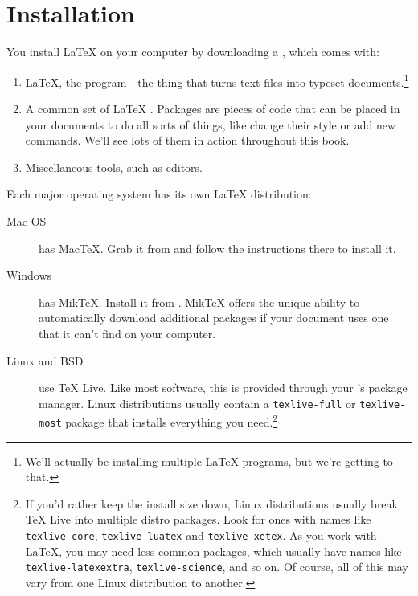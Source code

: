 \chapter{Installation}
\label{installation}

You install \LaTeX{} on your computer by downloading a ,
which comes with:
\begin{enumerate}
\item \LaTeX, the program---the thing that turns text files into typeset
    documents.\footnote{We'll actually be installing multiple \LaTeX{} programs,
    but we're getting to that.}
\item A common set of \LaTeX{} .
    Packages are pieces of code that can be placed in your documents to
    do all sorts of things, like change their style or add new commands.
    We'll see lots of them in action throughout this book.
\item Miscellaneous tools, such as editors.
\end{enumerate}
Each major operating system has its own \LaTeX{} distribution:
\begin{description}
\item[Mac OS] has Mac\TeX. Grab it from 
    and follow the instructions there to install it.

\item[Windows] has Mik\TeX.
    Install it from .
    Mik\TeX{} offers the unique ability to automatically download
    additional packages if your document uses one that it can't find
    on your computer.

\item[Linux and BSD] use \TeX{} Live.
    Like most software, this is provided through your
    's package manager.
    Linux distributions usually contain a \texttt{texlive-\allowbreak full}
    or \texttt{texlive-\allowbreak most} package that installs everything
    you need.\punckern\footnote{%
    If you'd rather keep the install size down,
    Linux distributions usually break \TeX{} Live into multiple distro packages.
    Look for ones with names like
    \texttt{texlive-\allowbreak core}, \texttt{texlive-\allowbreak luatex}
    and \texttt{texlive-\allowbreak xetex}.
    As you work with \LaTeX, you may need less-common packages,
    which usually have names like \texttt{texlive-\allowbreak latexextra},
    \texttt{texlive-\allowbreak science}, and so on.
    Of course, all of this may vary from one Linux distribution to another.}
\end{description}

